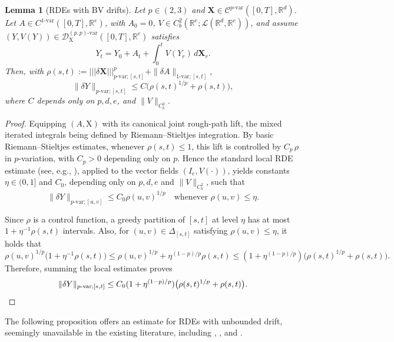 \documentclass[11pt,reqno]{amsart}
\newtheorem{lemma}{Lemma}[section]
\numberwithin{equation}{section}
\def\R{\mathbb R}
\newcommand{\triplenorm}[1]{%
\left|\!\left|\!\left|#1\right|\!\right|\!\right|%
}
\begin{document}
\begin{lemma}[RDEs with BV drifts]
\label{lem:BV perturbed RDE}
Let $p\in(2,3)$ and 
$\mathbf X\in\mathscr C^{p\text{-}\mathrm{var}}([0,T],\R^d)$.
Let $A\in C^{1\text{-}\mathrm{var}}([0,T],\R^e)$, with $A_0 =0$, $V\in C_b^{2}(\R^e;\mathscr L(\R^d,\R^e))$, and assume $(Y, V(Y)) \in \mathscr D^{(p,p)\text{-}\mathrm{var}}_{\mathrm X}([0,T],\R^e)$ satisfies 
\[
Y_t = Y_0 + A_t +\int_0^t V(Y_r)\,d\mathbf X_r.
\]
Then, with $\rho(s,t) := \triplenorm{\delta \mathbf X}^p_{p\text{-}\mathrm{var};[s,t]} + \|\delta A\|_{1\text{-}\mathrm{var};[s,t]}$,
\[
\|\delta Y\|_{p\text{-}\mathrm{var};[s,t]}
\le C\bigl(\rho(s,t)^{1/p}+\rho(s,t)\bigr),
\]
where $C$ depends only on $p,d,e$, and $\|V\|_{C_b^{2}}$.
\end{lemma}

\begin{proof}
Equipping $(A,\mathrm X)$ with its canonical joint rough-path lift, the mixed iterated integrals being defined by Riemann--Stieltjes integration. By basic Riemann--Stieltjes estimates, whenever $\rho(s,t)\le1$, this lift is controlled by $C_p \, \rho$ in $p$-variation, with $C_p > 0$ depending only on $p$. Hence the standard local RDE estimate (see, e.g., \cite[Lemma~10.7]{friz2010multidimensional}), applied to the vector fields $(I_e,V(\bm\cdot))$, yields constants $\eta\in(0,1]$ and $C_0$, depending only on $p,d,e$ and $\|V\|_{C_b^{2}}$, such that
\[
\|\delta Y\|_{p\text{-}\mathrm{var};[u,v]}
\le C_0 \rho(u,v)^{1/p}
\quad\text{whenever }\rho(u,v) \le \eta.
\]

Since $\rho$ is a control function, a greedy partition of $[s,t]$ at level $\eta$ has at most $1+\eta^{-1}\rho(s,t)$ intervals. Also, for $(u,v) \in \Delta_{[s,t]}$ satisfying $\rho(u,v) \le \eta$, it holds that 
\begin{equation*}
\rho(u,v)^{1/p} \bigl( 1 + \eta^{-1}\rho(s,t) \bigr) \le \rho(u,v)^{1/p} + \eta^{(1-p)/p} \rho(s,t) \le (1 + \eta^{(1-p)/p}) \bigl( \rho(s,t)^{1/p} + \rho(s,t) \bigr). 
\end{equation*}
Therefore, summing the local estimates proves
\[
\|\delta Y\|_{p\text{-}\mathrm{var};[s,t]}
\le C_0 (1 + \eta^{(1-p)/p}) \bigl( \rho(s,t)^{1/p}+\rho(s,t) \bigr).
\qedhere
\]
\end{proof}

The following proposition offers an estimate for RDEs with unbounded drift, seemingly unavailable in the existing literature, including \cite[Chapter~12]{friz2010multidimensional}, \cite[Theorem~3.4]{teichmann2011another}, and \cite{RiedelScheutzow2017}.
\end{document}
